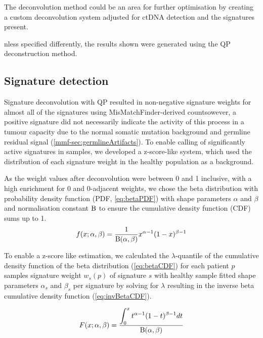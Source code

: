 The deconvolution method could be an area for further optimisation by creating a custom deconvolution system adjusted for ctDNA detection and the signatures present.

nless specified differently, the results shown  were generated using the QP deconstruction method.



\subsection{Signature detection}
\label{mmf-sec:sigdetection}
Signature deconvolution with QP resulted in non-negative signature weights for almost all of the signatures  using MisMatchFinder-derived countsowever, a positive signature did not necessarily indicate the activity of this process in a tumour capacity due to the normal somatic mutation background and germline residual signal (\autoref{mmf-sec:germlineArtifacts}). To enable  calling of significantly active signatures in samples, we developed a z-score-like system, which used the distribution of each signature weight in the healthy population as a background.

As the weight values after deconvolution were between 0 and 1 inclusive, with a high enrichment for 0 and 0-adjacent weights, we chose the beta distribution with probability density function (PDF, \autoref{eq:betaPDF}) with shape parameters $\alpha$ and $\beta$ and normalisation constant $\mathrm{B}$ to ensure the cumulative density function (CDF) sums up to 1. 
\begin{equation}
f(x; \alpha ,\beta)= \frac{1}{\mathrm{B}(\alpha, \beta)} x^{\alpha-1}(1-x)^{\beta-1}
\label{eq:betaPDF}
\end{equation}
\myequation[\ref{eq:betaPDF}]{Beta distribution probability density function}

To enable a z-score like estimation, we calculated the $\lambda$-quantile of the cumulative density function of the beta distribution (\autoref{eq:betaCDF}) for each patient $p$ samples signature weight $w_s(p)$ of signature $s$ with healthy sample fitted shape parameters $\alpha_s$ and $\beta_s$ per signature by solving  for $\lambda$ resulting in the inverse beta cumulative density function (\autoref{eq:invBetaCDF}). 

\begin{equation}
F(x; \alpha ,\beta) = \frac{\displaystyle\int_{0}^{x} t^{\alpha-1}(1-t)^{\beta-1} dt}{\mathrm{B}(\alpha, \beta)}
\label{eq:betaCDF} 
\end{equation}
\myequation[\ref{eq:betaCDF}]{Beta distribution cumulative density function}

